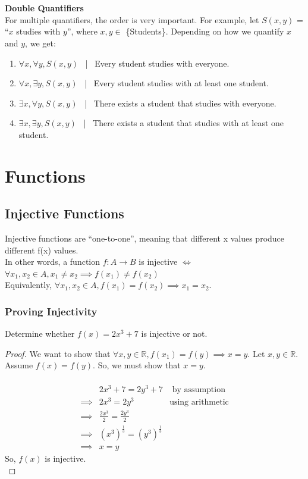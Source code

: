 \documentclass{article}
\begin{document}
\\
\\
\textbf{Double Quantifiers}\\
For multiple quantifiers, the order is very important. For example, let $S(x,y)$ = ``$x$ studies with $y$'', where $x,y \in$ \{Students\}. Depending on how we quantify $x$ and $y$, we get:
\begin{enumerate}
    \item $\forall x, \forall y, S(x,y)$ \ | \ Every student studies with everyone.
    \item $\forall x, \exists y, S(x, y)$ \ | \ Every student studies with at least one student.
    \item $\exists x, \forall y, S(x, y)$ \ | \ There exists a student that studies with everyone.
    \item $\exists x, \exists y, S(x, y)$ \ | \ There exists a student that studies with at least one student.
\end{enumerate}

\section{Functions}
\subsection{Injective Functions}
Injective functions are ``one-to-one'', meaning that different x values produce different f(x) values.\\
In other words, a function $f: A \rightarrow B$ is injective $\iff$ $\forall x_1, x_2 \in A, x_1 \neq x_2 \implies f(x_1) \neq f(x_2)$\\
Equivalently, $\forall x_1, x_2 \in A, f(x_1) = f(x_2) \implies x_1 = x_2$.
\subsubsection{Proving Injectivity}
Determine whether $f(x) = 2x^3 + 7$ is injective or not.
\begin{proof}
We want to show that $\forall x, y \in \mathbb{R}, f(x_1) = f(y) \implies x = y$. Let $x, y \in \mathbb{R}$. Assume $f(x) = f(y)$. So, we must show that $x = y$.\\\
\begin{align*}
    & 2x^3 + 7 = 2y^3 + 7 & \text{ by assumption}\\
    \implies & 2x^3 = 2y^3 & \text{using arithmetic}\\
    \implies & \frac{2x^3}{2} = \frac{2y^3}{2}\\
    \implies & (x^3)^\frac{1}{3} = (y^3)^\frac{1}{3}\\
    \implies & x = y
\end{align*}
So, $f(x)$ is injective.\\
\end{proof}
\end{document}
